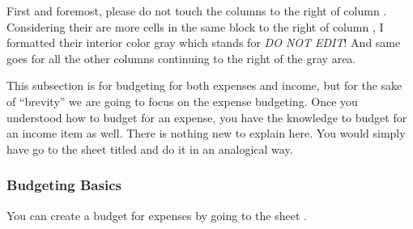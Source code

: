 First and foremost, please do not touch the columns to the right of column .
Considering their are more cells in the same block to the right of column , I formatted their interior color gray which stands for \emph{DO NOT EDIT}!
And same goes for all the other columns continuing to the right of the gray area.

This subsection is for budgeting for both expenses and income, but for the sake of ``brevity'' we are going to focus on the expense budgeting.
Once you understood how to budget for an expense, you have the knowledge to budget for an income item as well. There is nothing new to explain here.
You would simply have go to the sheet titled  and do it in an analogical way.

\subsubsection{Budgeting Basics}
\label{subsubsec:budgeting-basics}

You can create a budget for expenses by going to the sheet .


